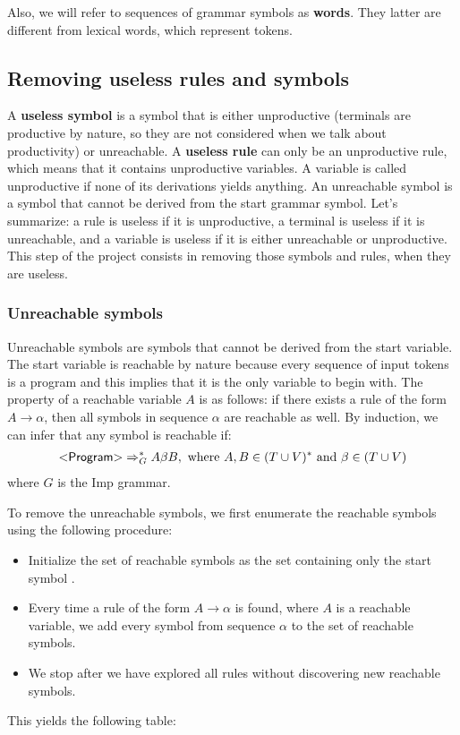 Also, we will refer to sequences of grammar symbols as \textbf{words}. They latter are different from lexical words, which represent tokens.


\subsection{Removing useless rules and symbols}

A \textbf{useless symbol} is a symbol that is either unproductive (terminals are productive by nature, so they are not considered when we talk about productivity) or unreachable. A \textbf{useless rule} can only be an unproductive rule, which means that it contains
unproductive variables. A variable is called unproductive if none of its derivations yields anything. An unreachable symbol is a symbol that cannot be derived
from the start grammar symbol. Let's summarize: a rule is useless if it is unproductive, a terminal is useless if it is unreachable, and a variable is useless if it is either unreachable or unproductive. This step of the project consists in removing those symbols and rules, when they are useless.

\subsubsection{Unreachable symbols}

Unreachable symbols are symbols that cannot be derived from the start variable. The start variable  is reachable by nature
because every sequence of input tokens is a program and this implies that it is the only variable to begin with. 
The property of a reachable variable $A$ is as follows: if there exists a rule of the form $A \rightarrow \alpha$, then all symbols in sequence $\alpha$
are reachable as well. By induction, we can infer that any symbol is reachable if:
\begin{equation}
  \begin{split}
    \varstyle{Program} \Rightarrow_{G}^{*} A \beta B, \text{ where } A, B \in (T \cup V)^{*} \text{ and } \beta \in (T \cup V)
   \end{split}
\end{equation}
where $G$ is the Imp grammar.

To remove the unreachable symbols, we first enumerate the reachable symbols using the following procedure:
\begin{itemize}
  \item Initialize the set of reachable symbols as the set containing only the start symbol .
  \item Every time a rule of the form $A \rightarrow \alpha$ is found, where $A$ is a reachable variable, we add every symbol from sequence $\alpha$
  to the set of reachable symbols.
  \item We stop after we have explored all rules without discovering new reachable symbols.
\end{itemize}
This yields the following table:

